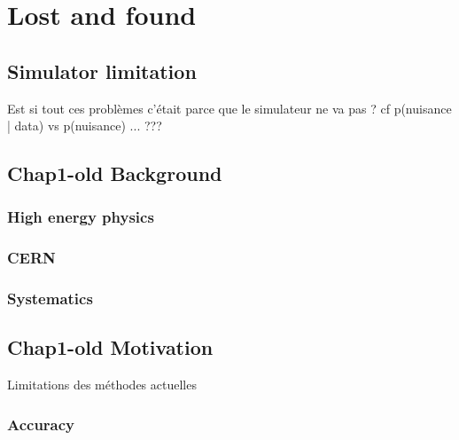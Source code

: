 
\ifpdf
    \graphicspath{{Appendix2/Figs/Raster/}{Appendix2/Figs/PDF/}{Appendix2/Figs/}}
\else
    \graphicspath{{Appendix2/Figs/Vector/}{Appendix2/Figs/}}
\fi

\chapter{Lost and found}



\section{Simulator limitation} %
\label{sec:simulator_limitation}

Est si tout ces problèmes c'était parce que le simulateur ne va pas ? cf p(nuisance | data) vs p(nuisance) ... ???

\section{Chap1-old Background}


\subsection{High energy physics} %
\label{sub:high_energy_physics}

\subsection{CERN} %
\label{sub:cern}


\subsection{Systematics} %
\label{sub:systematics}



\section{Chap1-old Motivation} %
\label{sec:old_motivation}

Limitations des méthodes actuelles

\subsection{Accuracy} %
\label{sub:accuracy}


